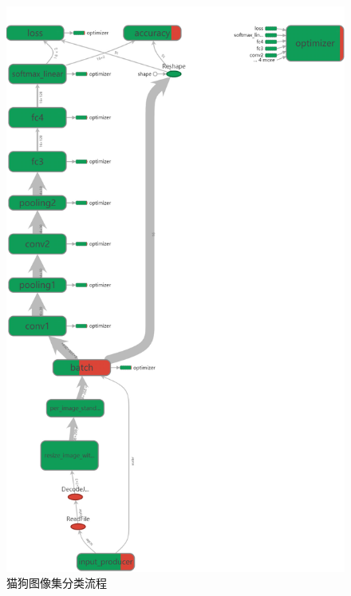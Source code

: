 \documentclass[a4paper,11pt]{ctexart}
\theoremstyle{break}
\theoremstyle{plain}
\begin{document}
\begin{figure}
	\centering
	\includegraphics[width=0.8\linewidth]{process.png}
	\caption{猫狗图像集分类流程\label{fig:process}}
\end{figure}
\end{document}
